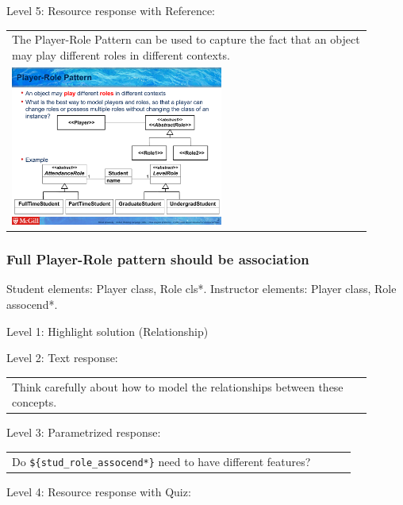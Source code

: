 \noindent Level 5: Resource response with Reference: \medskip

\begin{tabular}{|p{0.9\linewidth}}
The Player-Role Pattern can be used to capture the fact that an object may play different roles
in different contexts.

\\
\includegraphics[width=0.6\textwidth]{images/player_role.png}
\end{tabular} \medskip


\subsubsection{Full Player-Role pattern should be association}

Student elements: Player class, Role cls*. Instructor elements: Player class, Role assocend*. \medskip

\noindent Level 1: Highlight solution (Relationship) \medskip

\noindent Level 2: Text response: \medskip

\begin{tabular}{|p{0.9\linewidth}}
Think carefully about how to model the relationships between these concepts.
\end{tabular} \medskip

\noindent Level 3: Parametrized response: \medskip

\begin{tabular}{|p{0.9\linewidth}}
Do \verb|${stud_role_assocend*}| need to have different features?
\end{tabular} \medskip

\noindent Level 4: Resource response with Quiz: \medskip



